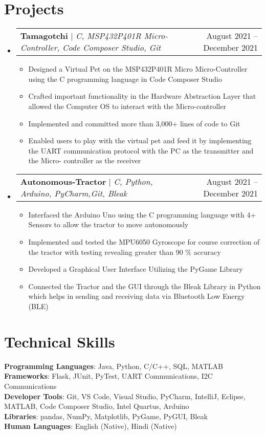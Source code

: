 \documentclass[letterpaper,10.5pt]{article}
\makeatletter
\newcommand{\resumeItem}[1]{
  \item\small{
    {#1 \vspace{-2pt}}
  }
}
\newcommand{\resumeProjectHeading}[2]{
    \item
    \begin{tabular*}{0.97\textwidth}{l@{\extracolsep{\fill}}r}
      \small#1 & #2 \\
    \end{tabular*}\vspace{-7pt}
}
\newcommand{\resumeSubHeadingListStart}{\begin{itemize}[leftmargin=0.15in, label={}]}
\newcommand{\resumeSubHeadingListEnd}{\end{itemize}}
\newcommand{\resumeItemListStart}{\begin{itemize}}
\newcommand{\resumeItemListEnd}{\end{itemize}\vspace{-5pt}}
\makeatother
\begin{document}
\section{Projects}
    \resumeSubHeadingListStart
      \resumeProjectHeading
          {\textbf{Tamagotchi} $|$ \emph{C, MSP432P401R Micro-Controller, Code Composer Studio, Git}}{August 2021 -- December 2021}
          \resumeItemListStart
          \resumeItem{Designed a Virtual Pet on the MSP432P401R Micro Micro-Controller using the C programming language in Code Composer Studio}
            \resumeItem{Crafted important functionality in the Hardware Abstraction Layer that allowed the Computer OS to interact with the Micro-controller}
            \resumeItem{Implemented and committed more than 3,000+ lines of code to Git}
            \resumeItem{Enabled users to play with the virtual pet and feed it by implementing the UART communication protocol with the PC as  the transmitter and the Micro- controller as the receiver}
          \resumeItemListEnd
      \resumeProjectHeading
          {\textbf{Autonomous-Tractor} $|$ \emph{C, Python, Arduino, PyCharm,Git, Bleak}}{August 2021 -- December 2021}
          \resumeItemListStart
            \resumeItem{Interfaced the Arduino Uno using the C programming language with 4+ Sensors to allow the tractor to move autonomously}
            \resumeItem{Implemented and tested the MPU6050 Gyroscope for course correction of the tractor with testing revealing greater than 90 \% accuracy  }
            \resumeItem{Developed a Graphical User Interface Utilizing the PyGame Library}
            \resumeItem{Connected the Tractor and the GUI through the Bleak Library in Python which helps in sending and receiving data via Bluetooth Low Energy (BLE) }
          \resumeItemListEnd
    \resumeSubHeadingListEnd



%
\section{Technical Skills}
 \begin{itemize}[leftmargin=0.15in, label={}]
    \small{\item{
     \textbf{Programming Languages}{: Java, Python, C/C++, SQL, MATLAB} \\
     \textbf{Frameworks}{: Flask, JUnit, PyTest, UART Communications, I2C Communications} \\
     \textbf{Developer Tools}{: Git, VS Code, Visual Studio, PyCharm, IntelliJ, Eclipse, MATLAB, Code Composer Studio, Intel Quartus, Arduino} \\
      \textbf{Libraries}{: pandas, NumPy, Matplotlib, PyGame, PyGUI, Bleak}
      \\
     \textbf{Human Languages}{: English (Native), Hindi (Native)} 
    }}
 \end{itemize}
\end{document}
